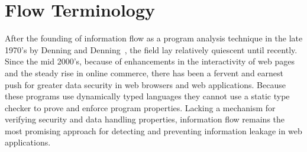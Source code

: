 \chapter{Flow Terminology}

\label{sec:terminology}

\begin{comment}
\begin{table*}
\centering
\begin{tabular}{ccccm{2.5cm}}
\toprule
Category & Descriptor & Example & Flow & Required Analysis \\
\midrule[\heavyrulewidth]
\multirow{3}{*}{Explicit} & Direct &
\begin{js-embed}
b = a
\end{js-embed} & a $\rightarrow$ b & Dataflow\\
\cmidrule(r){2-5} & Indirect &
\begin{js-embed}
b = foo(_, a, _)
c = bar(_, b, _)
\end{js-embed}
& a $\rightarrow$ c & Dataflow (transitive) \\
\hline
\multirow{7}{*}{Implicit} & Active &
\begin{js-embed}
a = true
b = 0
if (a)
   b = 1
else
   ...
\end{js-embed}
& a $\rightarrow$ b & Control Flow (dynamic)\\
\cmidrule(r){2-5} & Passive &
\begin{js-embed}
a = true
c = 0
if (a)
   ...
else
   c = 1
\end{js-embed}
& a $\rightarrow$ c & Control Flow (static)\\
\bottomrule
\end{tabular}
\caption{Terminology of Information Flows.}
\label{table:terminology}
\end{table*}
\end{comment}

After the founding of information flow as a program analysis technique in the late 1970's by Denning and Denning~\cite{denning.denning+77}, the field lay relatively quiescent until recently.
Since the mid 2000's, because of enhancements in the interactivity of web pages and the steady rise in online commerce, there has been a fervent and earnest push for greater data security in web browsers and web applications.
Because these programs use dynamically typed languages they cannot use a static type checker to prove and enforce program properties.
Lacking a mechanism for verifying security and data handling properties, information flow remains the most promising approach for detecting and preventing information leakage in web applications.

